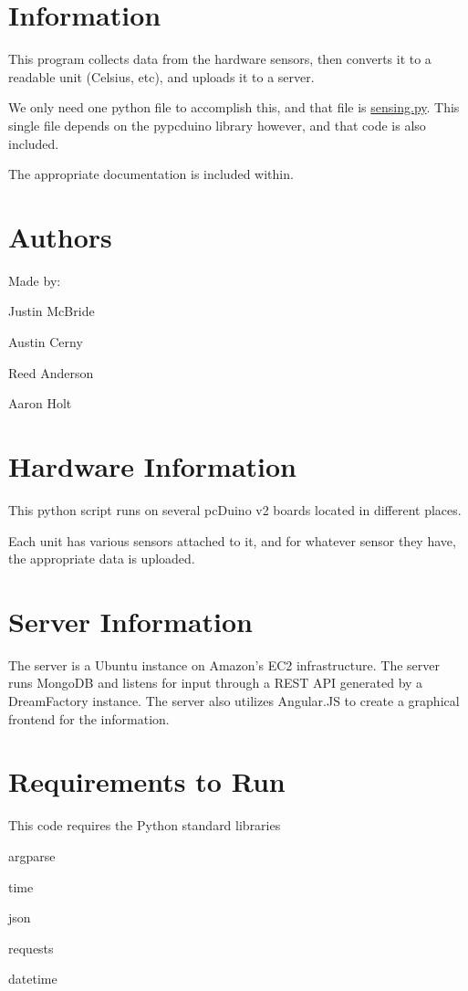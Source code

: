 \hypertarget{index_information}{}\section{Information}\label{index_information}
This program collects data from the hardware sensors, then converts it to a readable unit (Celsius, etc), and uploads it to a server.

We only need one python file to accomplish this, and that file is \hyperlink{sensing_8py}{sensing.\-py}. This single file depends on the pypcduino library however, and that code is also included.

The appropriate documentation is included within.\hypertarget{index_authors}{}\section{Authors}\label{index_authors}
Made by\-:
\begin{DoxyItemize}
\item Justin Mc\-Bride
\item Austin Cerny
\item Reed Anderson
\item Aaron Holt
\end{DoxyItemize}\hypertarget{index_hardwareinfo}{}\section{Hardware Information}\label{index_hardwareinfo}
This python script runs on several pc\-Duino v2 boards located in different places.

Each unit has various sensors attached to it, and for whatever sensor they have, the appropriate data is uploaded.\hypertarget{index_serverinfo}{}\section{Server Information}\label{index_serverinfo}
The server is a Ubuntu instance on Amazon's E\-C2 infrastructure. The server runs Mongo\-D\-B and listens for input through a R\-E\-S\-T A\-P\-I generated by a Dream\-Factory instance. The server also utilizes Angular.\-J\-S to create a graphical frontend for the information.\hypertarget{index_requirements}{}\section{Requirements to Run}\label{index_requirements}
This code requires the Python standard libraries
\begin{DoxyItemize}
\item argparse
\item time
\item json
\item requests
\item datetime
\end{DoxyItemize}


